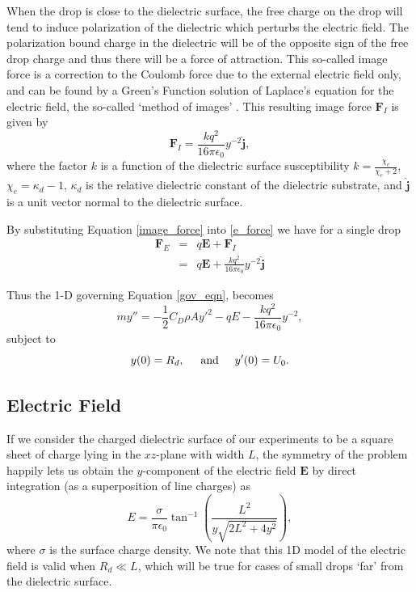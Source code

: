 \documentclass[aip,reprint, floatfix]{revtex4-1}
\begin{document}
When the drop is close to the dielectric surface, the free charge on the drop will tend to induce polarization of the dielectric which perturbs the electric field. The polarization bound charge in the dielectric will be of the opposite sign of the free drop charge and thus there will be a force of attraction. This so-called image force is a correction to the Coulomb force due to the external electric field only, and can be found by a Green's Function solution of Laplace's equation for the electric field, the so-called `method of images' \cite{david_j._griffiths_introduction_1999}. This resulting image force $\mathbf{F}_I$ is given by
\begin{equation}
\mathbf{F}_I = \frac{k q^2}{16 \pi \epsilon_0} y^{-2} \hat{\mathbf{j}},
\label{image_force}
\end{equation}
where the factor $k$ is a function of the dielectric surface susceptibility $k = \frac{\chi_e}{\chi_e + 2}$, $\chi_e = \kappa_d - 1$, $\kappa_d$ is the relative dielectric constant of the dielectric substrate, and $\hat{\mathbf{j}}$ is a unit vector normal to the dielectric surface.

By substituting Equation \ref{image_force} into \ref{e_force} we have for a single drop
\begin{eqnarray}
 \mathbf{F}_E &=& q \mathbf{E} + \mathbf{F}_I \nonumber \\
 &=& q \mathbf{E} + \frac{k q^2}{16 \pi \epsilon_0 } y^{-2} \hat{\mathbf{j}} \label{e_forces}
\end{eqnarray}

Thus the 1-D governing Equation \ref{gov_eqn}, becomes
\begin{equation}
 \label{gov_eqn_subs}
m y'' = - \frac{1}{2} C_D \rho A {y'}^2 - q E - \frac{k q^2}{16 \pi \epsilon_0} y^{-2},
\end{equation}
subject to
\begin{equation}
y(0) = R_d, \hspace{5 mm} \mbox{and} \hspace{5 mm} y'(0) = U_0 .
\end{equation}

\subsection{Electric Field}
If we consider the charged dielectric surface of our experiments to be a square sheet of charge lying in the $xz$-plane with width $L$, the symmetry of the problem happily lets us obtain the $y$-component of the electric field $\mathbf{E}$ by direct integration (as a superposition of line charges) \citep{david_j._griffiths_introduction_1999} as
\begin{equation}
\label{e_field}
E = \frac{\sigma}{ \pi \epsilon_0} \tan^{-1} \left( \frac{L^2}{y \sqrt{2L^2 + 4y^2}}\right)
,\end{equation}
where $\sigma$ is the surface charge density. We note that this 1D model of the electric field is valid when $R_d \ll L$, which will be true for cases of small drops `far' from the dielectric surface. 
\end{document}
